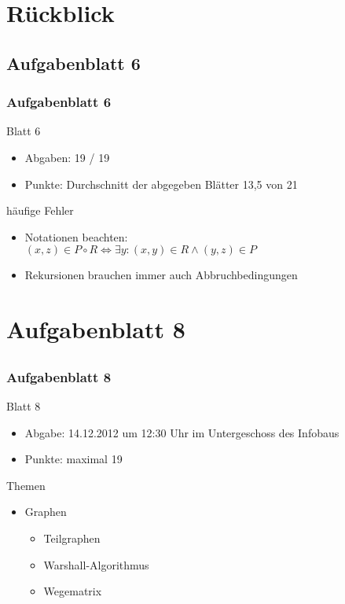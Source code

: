 

\section{Rückblick}

\subsection{Aufgabenblatt 6}
\begin{frame}
	\frametitle{Aufgabenblatt 6}
	\begin{block}{Blatt 6}
		\begin{itemize}
			\item Abgaben: 19 / 19
			\item Punkte: Durchschnitt der abgegeben Blätter 13,5 von 21
		\end{itemize}
   \end{block}
	\begin{block}{häufige Fehler}
 		\begin{itemize}
 	  		\item Notationen beachten: \\
			$(x,z) \in P \circ R \Leftrightarrow \exists y: (x,y)\in R \land  (y,z)\in P$\pause
 	  		\item Rekursionen brauchen immer auch Abbruchbedingungen
 	  \end{itemize}
	\end{block}
\end{frame}


\section[Blatt 8]{Aufgabenblatt 8}
\subsection*{}
\begin{frame}
	\frametitle{Aufgabenblatt 8}
	\begin{block}{Blatt 8}
		\begin{itemize}
			\item Abgabe: 14.12.2012 um 12:30 Uhr im Untergeschoss des Infobaus
			\item Punkte: maximal 19 
		\end{itemize}
  	\end{block}
	\begin{block}{Themen}
		\begin{itemize}
	  		\item Graphen
				\begin{itemize}
					\item Teilgraphen
					\item Warshall-Algorithmus
					\item Wegematrix
				\end{itemize}
	 	\end{itemize}
	\end{block}
\end{frame}
